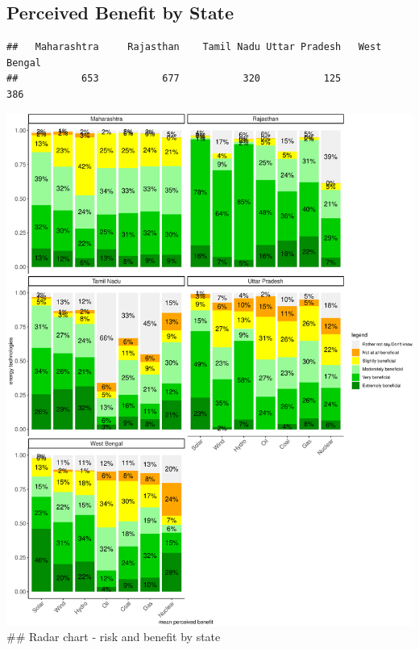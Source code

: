 \documentclass[
]{article}
\begin{document}
\newpage

\hypertarget{perceived-benefit-by-state}{%
\subsection{Perceived Benefit by
State}\label{perceived-benefit-by-state}}

\begin{verbatim}
##   Maharashtra     Rajasthan    Tamil Nadu Uttar Pradesh   West Bengal 
##           653           677           320           125           386
\end{verbatim}

\includegraphics[width=1\linewidth,height=1\textheight]{nuclear-in-comparison_files/figure-latex/unnamed-chunk-16-1}
\#\# Radar chart - risk and benefit by state
\end{document}
